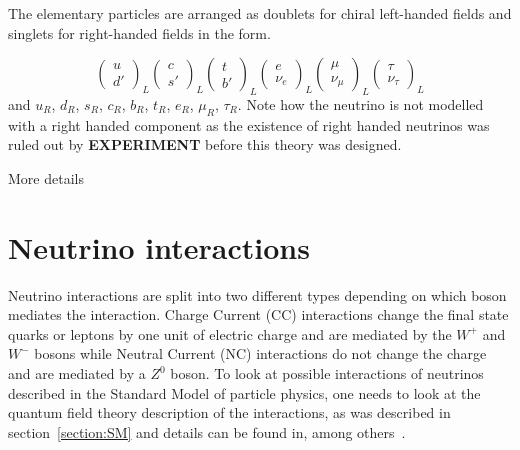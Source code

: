 The elementary particles are arranged as doublets for chiral left-handed fields and singlets for right-handed fields in the form.

\begin{equation}
\begin{pmatrix}
    u\\
    d'
\end{pmatrix}_L
\begin{pmatrix}
    c\\
    s'
\end{pmatrix}_L
\begin{pmatrix}
    t\\
    b'
\end{pmatrix}_L
\begin{pmatrix}
    e\\
    \nu_e
\end{pmatrix}_L
\begin{pmatrix}
    \mu\\
    \nu_\mu
\end{pmatrix}_L
\begin{pmatrix}
    \tau\\
    \nu_\tau
\end{pmatrix}_L
\end{equation}
and $u_R$,  $d_R$, $s_R$, $c_R$, $b_R$, $t_R$, $e_R$, $\mu_R$, $\tau_R$. 
Note how the neutrino is not modelled with a right handed component as the existence of right handed neutrinos was ruled out by \textbf{EXPERIMENT} before this theory was designed.

More details
\fi

\pagebreak

\section{Neutrino interactions}\label{subsection:Neutrino interactions}

Neutrino interactions are split into two different types depending on which boson mediates the interaction.
Charge Current (CC) interactions change the final state quarks or leptons by one unit of electric charge and are mediated by the $W^+$ and $W^-$ bosons while Neutral Current (NC) interactions do not change the charge and are mediated by a $Z^0$ boson. 
To look at possible interactions of neutrinos described in the Standard Model of particle physics, one needs to look at the quantum field theory description of the interactions, as was described in section~\ref{section:SM} and details can be found in, among others~\cite{3Peskin, 2Hallsjo}.  %

